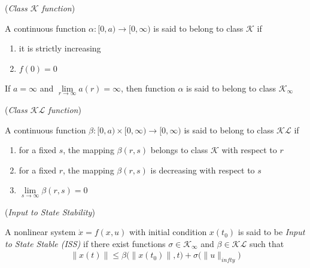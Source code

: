 \begin{bw_box}
\begin{definition}\cite{khalil_nonlinear_systems} (\textit{Class $\mathcal{K}$ function})

  A continuous function $\alpha : [0, a) \to [0, \infty)$
  is said to belong to class $\mathcal{K}$ if
  \begin{enumerate}
    \item it is strictly increasing
    \item $f(0) = 0$
  \end{enumerate}
  If $a = \infty$ and $\lim\limits_{r \to \infty} a(r) = \infty$, then function
  $\alpha$ is said to belong to class $\mathcal{K}_{\infty}$
  \label{def:k_class}
\end{definition}
\end{bw_box}

\begin{bw_box}
\begin{definition}\cite{khalil_nonlinear_systems} (\textit{Class $\mathcal{KL}$ function})

  A continuous function $\beta : [0, a) \times [0, \infty) \to [0, \infty)$
  is said to belong to class $\mathcal{KL}$ if
  \begin{enumerate}
    \item for a fixed $s$, the mapping $\beta(r,s)$ belongs to class $\mathcal{K}$ with respect to $r$
    \item for a fixed $r$, the mapping $\beta(r,s)$ is decreasing with respect
      to $s$
    \item $\lim\limits_{s \to \infty} \beta(r,s) = 0$
  \end{enumerate}
  \label{def:kl_class}
\end{definition}
\end{bw_box}


\begin{bw_box}
\begin{definition}\cite{Sontag2008} (\textit{Input to State Stability})

  A nonlinear system $\dot{x} = f(x,u)$ with initial condition $x(t_0)$ is said
  to be \textit{Input to State Stable (ISS)} if there exist functions
  $\sigma \in \mathcal{K}_{\infty}$ and $\beta \in \mathcal{KL}$ such that
  \begin{align}
    \|x(t)\| \leq \beta\big(\|x(t_0)\|,t\big) + \sigma\big(\|u\|_{infty}\big)
  \end{align}
  \label{def:ISS}
\end{definition}
\end{bw_box}

